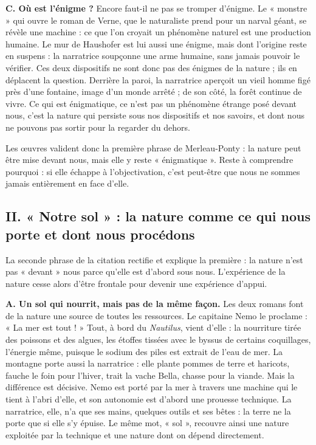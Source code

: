 \documentclass[11pt,a4paper]{article}
\begin{document}
\textbf{C. Où est l'énigme ?} Encore faut-il ne pas se tromper d'énigme. Le « monstre » qui ouvre le roman de Verne, que le naturaliste prend pour un narval géant, se révèle une machine : ce que l'on croyait un phénomène naturel est une production humaine. Le mur de Haushofer est lui aussi une énigme, mais dont l'origine reste en suspens : la narratrice soupçonne une arme humaine, sans jamais pouvoir le vérifier. Ces deux dispositifs ne sont donc pas des énigmes de la nature ; ils en déplacent la question. Derrière la paroi, la narratrice aperçoit un vieil homme figé près d'une fontaine, image d'un monde arrêté ; de son côté, la forêt continue de vivre. Ce qui est énigmatique, ce n'est pas un phénomène étrange posé devant nous, c'est la nature qui persiste sous nos dispositifs et nos savoirs, et dont nous ne pouvons pas sortir pour la regarder du dehors.

Les œuvres valident donc la première phrase de Merleau-Ponty : la nature peut être mise devant nous, mais elle y reste « énigmatique ». Reste à comprendre pourquoi : si elle échappe à l'objectivation, c'est peut-être que nous ne sommes jamais entièrement en face d'elle.

\hypertarget{ii.-notre-sol-la-nature-comme-ce-qui-nous-porte-et-dont-nous-procuxe9dons}{%
\subsection{II. « Notre sol » : la nature comme ce qui nous porte et dont nous procédons}\label{ii.-notre-sol-la-nature-comme-ce-qui-nous-porte-et-dont-nous-procuxe9dons}}

La seconde phrase de la citation rectifie et explique la première : la nature n'est pas « devant » nous parce qu'elle est d'abord sous nous. L'expérience de la nature cesse alors d'être frontale pour devenir une expérience d'appui.

\textbf{A. Un sol qui nourrit, mais pas de la même façon.} Les deux romans font de la nature une source de toutes les ressources. Le capitaine Nemo le proclame : « La mer est tout ! » Tout, à bord du \emph{Nautilus}, vient d'elle : la nourriture tirée des poissons et des algues, les étoffes tissées avec le byssus de certains coquillages, l'énergie même, puisque le sodium des piles est extrait de l'eau de mer. La montagne porte aussi la narratrice : elle plante pommes de terre et haricots, fauche le foin pour l'hiver, trait la vache Bella, chasse pour la viande. Mais la différence est décisive. Nemo est porté par la mer à travers une machine qui le tient à l'abri d'elle, et son autonomie est d'abord une prouesse technique. La narratrice, elle, n'a que ses mains, quelques outils et ses bêtes : la terre ne la porte que si elle s'y épuise. Le même mot, « sol », recouvre ainsi une nature exploitée par la technique et une nature dont on dépend directement.
\end{document}
